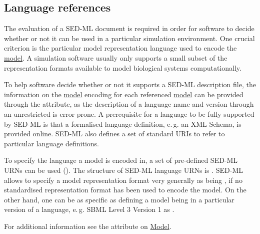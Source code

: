 \subsection{Language references}
\label{sec:languageURI}
The evaluation of a SED-ML document is required in order for software to decide whether or not it can be used in a particular simulation environment. One crucial criterion is the particular model representation language used to encode the \hyperref[class:model]{model}. A simulation software usually only supports a small subset of the representation formats available to model biological systems computationally. 

To help  software decide whether or not it supports a SED-ML description file, the information on the \hyperref[class:model]{model} encoding for each referenced \hyperref[class:model]{model} can be provided through the \hyperref[sec:language]{} attribute, as the description of a language name and version through an unrestricted  is error-prone. 
A prerequisite for a language to be fully supported by SED-ML is that a formalised language definition, e.\,g. an XML Schema, is provided online. SED-ML also defines a set of standard URIs to refer to particular language definitions. 

To specify the language a model is encoded in, a set of pre-defined SED-ML URNs can be used (). The structure of SED-ML language URNs is \emph{}. SED-ML allows to specify a model representation format very generally as being , if no standardised representation format has been used to encode the model. On the other hand, one can be as specific as defining a model being in a particular version of a language, e.\,g. SBML Level 3 Version 1 as .

For additional information see the \hyperref[sec:language]{} attribute on \hyperref[class:model]{Model}.


